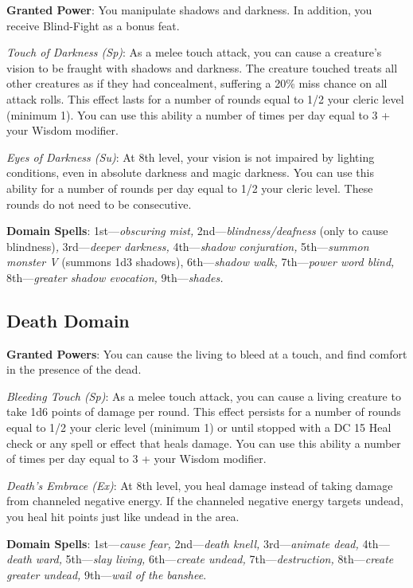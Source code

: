 				
\textbf{Granted Power}: You manipulate shadows and darkness. In addition, you receive Blind-Fight as a bonus feat.
				
\textit{Touch of Darkness (Sp)}: As a melee touch attack, you can cause a creature's vision to be fraught with shadows and darkness. The creature touched treats all other creatures as if they had concealment, suffering a 20\% miss chance on all attack rolls. This effect lasts for a number of rounds equal to 1/2 your cleric level (minimum 1). You can use this ability a number of times per day equal to 3 + your Wisdom modifier.
				
\textit{Eyes of Darkness (Su)}: At 8th level, your vision is not impaired by lighting conditions, even in absolute darkness and magic darkness. You can use this ability for a number of rounds per day equal to 1/2 your cleric level. These rounds do not need to be consecutive.
				
\textbf{Domain Spells}: 1st---\textit{obscuring mist, }2nd---\textit{blindness/deafness} (only to cause blindness)\textit{, }3rd---\textit{deeper darkness, }4th---\textit{shadow conjuration, }5th---\textit{summon monster V }(summons 1d3 shadows), 6th---\textit{shadow walk, }7th---\textit{power word blind, }8th---\textit{greater shadow evocation, }9th---\textit{shades. } 
				
\subsection{Death Domain}

				
\textbf{Granted Powers}: You can cause the living to bleed at a touch, and find comfort in the presence of the dead.
				
\textit{Bleeding Touch (Sp)}: As a melee touch attack, you can cause a living creature to take 1d6 points of damage per round. This effect persists for a number of rounds equal to 1/2 your cleric level (minimum 1) or until stopped with a DC 15 Heal check or any spell or effect that heals damage. You can use this ability a number of times per day equal to 3 + your Wisdom modifier.
				
\textit{Death's Embrace (Ex)}: At 8th level, you heal damage instead of taking damage from channeled negative energy. If the channeled negative energy targets undead, you heal hit points just like undead in the area.
				
\textbf{Domain Spells}: 1st---\textit{cause fear, }2nd---\textit{death knell, }3rd---\textit{animate dead, }4th---\textit{death ward, }5th---\textit{slay living, }6th---\textit{create undead, }7th---\textit{destruction, }8th---\textit{create greater undead, }9th---\textit{wail of the banshee}. 
				
